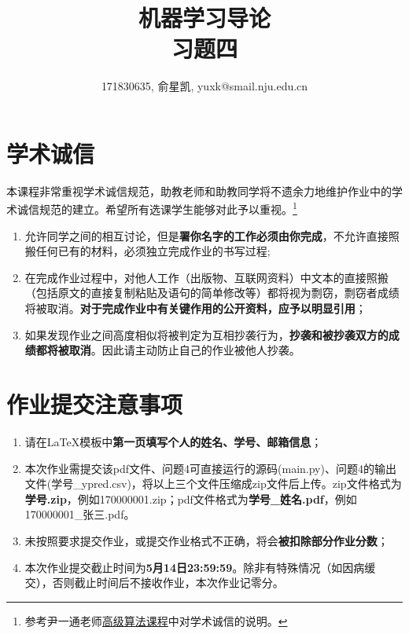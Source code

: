 \documentclass[a4paper,UTF8]{article}
\theoremstyle{definition}
\begin{document}
\title{机器学习导论\\习题四}
\author{171830635, 俞星凯, yuxk@smail.nju.edu.cn}
\maketitle


\section*{学术诚信}

本课程非常重视学术诚信规范，助教老师和助教同学将不遗余力地维护作业中的学术诚信规范的建立。希望所有选课学生能够对此予以重视。\footnote{参考尹一通老师\href{http://tcs.nju.edu.cn/wiki/}{高级算法课程}中对学术诚信的说明。}

\begin{tcolorbox}
	\begin{enumerate}
		\item[(1)] 允许同学之间的相互讨论，但是{\color{red}\textbf{署你名字的工作必须由你完成}}，不允许直接照搬任何已有的材料，必须独立完成作业的书写过程;
		\item[(2)] 在完成作业过程中，对他人工作（出版物、互联网资料）中文本的直接照搬（包括原文的直接复制粘贴及语句的简单修改等）都将视为剽窃，剽窃者成绩将被取消。{\color{red}\textbf{对于完成作业中有关键作用的公开资料，应予以明显引用}}；
		\item[(3)] 如果发现作业之间高度相似将被判定为互相抄袭行为，{\color{red}\textbf{抄袭和被抄袭双方的成绩都将被取消}}。因此请主动防止自己的作业被他人抄袭。
	\end{enumerate}
\end{tcolorbox}

\section*{作业提交注意事项}
\begin{tcolorbox}
	\begin{enumerate}
		\item[(1)] 请在LaTeX模板中{\color{red}\textbf{第一页填写个人的姓名、学号、邮箱信息}}；
		\item[(2)] 本次作业需提交该pdf文件、问题4可直接运行的源码(main.py)、问题4的输出文件(学号\_ypred.csv)，将以上三个文件压缩成zip文件后上传。zip文件格式为{\color{red}\textbf{学号.zip}}，例如170000001.zip；pdf文件格式为{\color{red}\textbf{学号\_姓名.pdf}}，例如170000001\_张三.pdf。
		\item[(3)] 未按照要求提交作业，或提交作业格式不正确，将会{\color{red}\textbf{被扣除部分作业分数}}；
		\item[(4)] 本次作业提交截止时间为{\color{red}\textbf{5月14日23:59:59}}。除非有特殊情况（如因病缓交），否则截止时间后不接收作业，本次作业记零分。
	\end{enumerate}
\end{tcolorbox}
\end{document}
